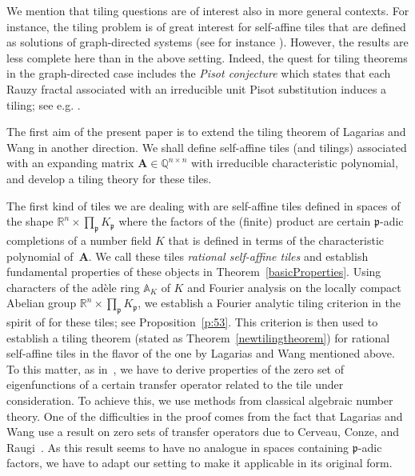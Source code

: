 \documentclass[12pt]{amsart}
\theoremstyle{definition}
\theoremstyle{remark}
\numberwithin{equation}{section}
\begin{document}
We mention that tiling questions are of interest also in more general contexts. For instance, the tiling problem is of great interest for self-affine tiles that are defined as solutions of graph-directed systems (see for instance \cite{Kenyon-Vershik:98,Grochenig-Haas-Raugi:99,Lagarias-Wang:03,Ito-Rao:06,Kenyon-Solomyak:10}). However, the results are less complete here than in the above setting. Indeed, the quest for tiling theorems in the graph-directed case includes the {\it Pisot conjecture} which states that each Rauzy fractal associated with an irreducible unit Pisot substitution induces a tiling; see e.g. \cite{Barge-Kwapisz:06,Ito-Rao:06}.

The first aim of the present paper is to extend the tiling theorem of Lagarias and Wang in another direction. We shall define self-affine tiles (and tilings) associated with an expanding matrix $\mathbf{A} \in \mathbb{Q}^{n\times n}$ with irreducible characteristic polynomial, and develop a tiling theory for these tiles.

The first kind of tiles we are dealing with are self-affine tiles defined in spaces of the shape $\mathbb{R}^n\times \prod_\mathfrak{p} K_\mathfrak{p}$ where the factors of the (finite) product are certain $\mathfrak{p}$-adic completions of a number field $K$ that is defined in terms of the characteristic polynomial of~$\mathbf{A}$.
We call these tiles \emph{rational self-affine tiles} and establish fundamental properties of these objects in Theorem~\ref{basicProperties}.
Using characters of the ad\`ele ring $\mathbb{A}_K$ of $K$ and Fourier analysis on the locally compact Abelian group $\mathbb{R}^n\times \prod_\mathfrak{p} K_\mathfrak{p}$, we establish a Fourier analytic tiling criterion in the spirit of \cite[Proposition~5.3]{Groechenig-Haas:94} for these tiles; see Proposition~\ref{p:53}. This criterion is then used to establish a tiling theorem (stated as Theorem~\ref{newtilingtheorem}) for rational self-affine tiles in the flavor of the one by Lagarias and Wang mentioned above.
To this matter, as in~\cite{Lagarias-Wang:97}, we have to derive properties of the zero set of eigenfunctions of a certain transfer operator related to the tile under consideration. To achieve this, we use methods from classical algebraic number theory. One of the difficulties in the proof comes from the fact that Lagarias and Wang use a result on zero sets of transfer operators due to Cerveau, Conze, and Raugi~\cite{Cerveau-Conze-Raugi:96}. As this result seems to have no analogue in spaces containing $\mathfrak{p}$-adic factors, we have to adapt our setting to make it applicable in its original form.
\end{document}
